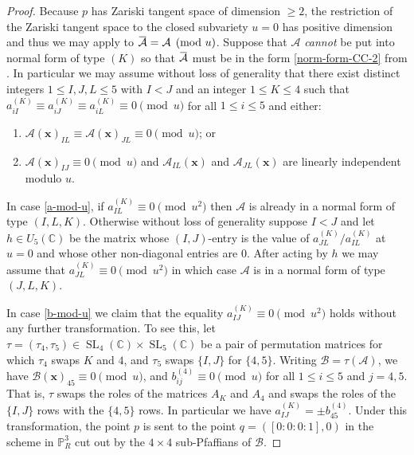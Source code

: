 \documentclass[11pt]{amsart}
\numberwithin{theorem}{section}
\numberwithin{equation}{section}
\theoremstyle{definition}\newtheorem{defn}[theorem]{Definition}
\theoremstyle{definition}\newtheorem{remark}[theorem]{Remark}
\theoremstyle{definition}\newtheorem{question}[theorem]{Question}
\theoremstyle{definition}\newtheorem{problem}[theorem]{Problem}
\newcommand{\CC}{\mathbb{C}}
\newcommand{\PP}{\mathbb{P}}
\newcommand{\cB}{\mathcal{B}}
\newcommand{\cA}{\mathcal{A}}
\newcommand{\overbar}[1]{\mkern 1.5mu\overline{\mkern-1.5mu#1\mkern-1.5mu}\mkern 1.5mu}
\DeclareMathOperator{\SL}{SL}
\newcommand{\I}{I}
\newcommand{\J}{J}
\newcommand{\K}{K}
\renewcommand{\L}{L}
\begin{document}
\begin{proof}
Because $p$ has Zariski tangent space of dimension $\geq 2$, the restriction of the Zariski tangent space to the closed subvariety $u = 0$ has positive dimension and thus we may apply  to $\overbar{\cA} = \cA \pmod{u}$. Suppose that $\cA$ \emph{cannot} be put into normal form of type $(\K)$ so that $\overbar{\cA}$ must be in the form \ref{norm-form-CC-2} from . In particular we may assume without loss of generality that there exist distinct integers $1 \leq \I,\J, \L \leq 5$ with $\I < \J$ and an integer $1 \leq \K \leq 4$ such that $a_{i \I}^{(\K)} \equiv a_{i \J}^{(\K)} \equiv a_{i \L}^{(\K)} \equiv 0 \pmod u$ for all $1 \leq i \leq 5$ and either:
\begin{enumerate}[label=(\roman*)]
    \item \label{a-mod-u} $\cA(\mathbf{x})_{\I\L} \equiv \cA(\mathbf{x})_{\J\L} \equiv 0 \pmod{u}$; or
    \item \label{b-mod-u} $\cA(\mathbf{x})_{\I\J}  \equiv 0 \pmod{u}$ and $\cA_{I\L}(\mathbf{x})$ and $\cA_{J\L}(\mathbf{x})$ are linearly independent modulo $u$.
\end{enumerate}

In case \ref{a-mod-u}, if $a_{\I\L}^{(\K)} \equiv 0 \pmod{u^2}$ then $\cA$ is already in a normal form of type $(\I, \L, \K)$. Otherwise without loss of generality suppose $\I < \J$ and let $h \in U_5(\CC)$ be the matrix whose $(\I,\J)$-entry is the value of $a_{\J\L}^{(\K)} / a_{\I\L}^{(\K)}$ at $u = 0$ and whose other non-diagonal entries are $0$. After acting by $h$ we may assume that $a_{\J\L}^{(\K)} \equiv 0 \pmod{u^2}$ in which case $\cA$ is in a normal form of type $(\J, \L, \K)$.

In case \ref{b-mod-u} we claim that the equality $a_{\I\J}^{(\K)} \equiv 0 \pmod{u^2}$ holds without any further transformation. To see this, let $\tau = (\tau_4, \tau_5) \in \SL_4(\CC) \times \SL_5(\CC)$ be a pair of permutation matrices for which $\tau_4$ swaps $\K$ and $4$, and $\tau_5$ swaps $\{\I,\J\}$ for $\{4,5\}$. Writing $\mathcal{B} = \tau(\cA)$, we have $\cB(\mathbf{x})_{45} \equiv 0 \pmod u$, and $b_{ij}^{(4)} \equiv 0 \pmod u$ for all $1 \leq i \leq 5$ and $j = 4,5$. That is, $\tau$ swaps the roles of the matrices $A_\K$ and $A_4$ and swaps the roles of the $\{\I,\J\}$ rows with the $\{4,5\}$ rows. In particular we have $a_{\I\J}^{(\K)} = \pm b_{45}^{(4)}$. Under this transformation, the point $p$ is sent to the point ${q} = ([0:0:0:1],0)$ in the scheme in $\PP^3_R$ cut out by the $4 \times 4$ sub-Pfaffians of $\cB$. 


\end{proof}
\end{document}
